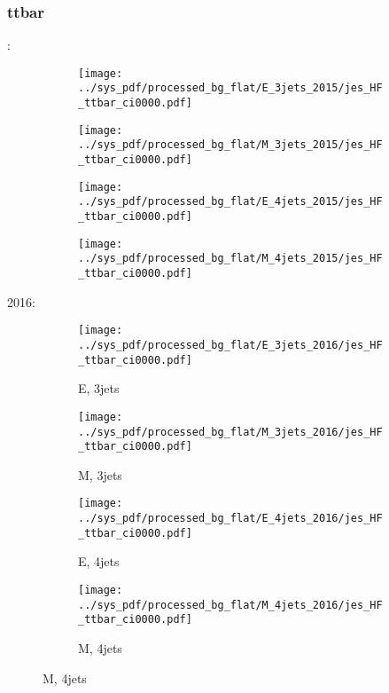\documentclass{beamer}
\begin{document}
\begin{frame}
\frametitle{ttbar}
\fontsize{5}{1}:
\begin{figure}
\centering
\begin{subfigure}[b]{0.24\textwidth}
\texttt{[image: ../sys\_pdf/processed\_bg\_flat/E\_3jets\_2015/jes\_HF\_ttbar\_ci0000.pdf]}
\end{subfigure}
\begin{subfigure}[b]{0.24\textwidth}
\texttt{[image: ../sys\_pdf/processed\_bg\_flat/M\_3jets\_2015/jes\_HF\_ttbar\_ci0000.pdf]}
\end{subfigure}
\begin{subfigure}[b]{0.24\textwidth}
\texttt{[image: ../sys\_pdf/processed\_bg\_flat/E\_4jets\_2015/jes\_HF\_ttbar\_ci0000.pdf]}
\end{subfigure}
\begin{subfigure}[b]{0.24\textwidth}
\texttt{[image: ../sys\_pdf/processed\_bg\_flat/M\_4jets\_2015/jes\_HF\_ttbar\_ci0000.pdf]}
\end{subfigure}
\end{figure}
2016:
\begin{figure}
\centering
\begin{subfigure}[b]{0.24\textwidth}
\texttt{[image: ../sys\_pdf/processed\_bg\_flat/E\_3jets\_2016/jes\_HF\_ttbar\_ci0000.pdf]}
\captionsetup{font=tiny}
\caption{E, 3jets}
\end{subfigure}
\begin{subfigure}[b]{0.24\textwidth}
\texttt{[image: ../sys\_pdf/processed\_bg\_flat/M\_3jets\_2016/jes\_HF\_ttbar\_ci0000.pdf]}
\captionsetup{font=tiny}
\caption{M, 3jets}
\end{subfigure}
\begin{subfigure}[b]{0.24\textwidth}
\texttt{[image: ../sys\_pdf/processed\_bg\_flat/E\_4jets\_2016/jes\_HF\_ttbar\_ci0000.pdf]}
\captionsetup{font=tiny}
\caption{E, 4jets}
\end{subfigure}
\begin{subfigure}[b]{0.24\textwidth}
\texttt{[image: ../sys\_pdf/processed\_bg\_flat/M\_4jets\_2016/jes\_HF\_ttbar\_ci0000.pdf]}
\captionsetup{font=tiny}
\caption{M, 4jets}
\end{subfigure}
\end{figure}
\end{frame}
\end{document}
